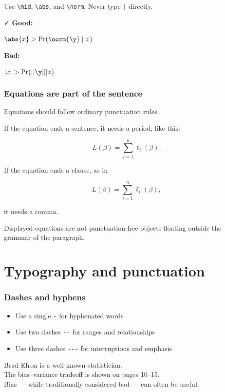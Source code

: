 \documentclass{article}
\newcommand{\xmark}{\textcolor{red}{\faXmark}}
\newcommand{\cmark}{\textcolor{goodcolor}{\faCheck}}
\newcommand{\bad}{\xmark\; \textbf{Bad:}}
\newcommand{\good}{\cmark\; \textbf{Good:}}
\begin{document}
Use \verb|\mid|, \verb|\abs|, and \verb|\norm|. Never type \verb/|/ directly.

\good

\begin{LTXexample}
$ \abs{x} > \Pr(\norm{\y} \mid z $)
\end{LTXexample}

\bad

\begin{LTXexample}
$ |x| > \Pr(||\y|| | z $)
\end{LTXexample}

\subsubsection*{Equations are part of the sentence}

Equations should follow ordinary punctuation rules.

\begin{LTXexample}
If the equation ends a sentence, it needs a
period, like this:

$$ L(\beta) = \sum_{i=1}^n \ell_i(\beta). $$

If the equation ends a clause, as in

$$ L(\beta) = \sum_{i=1}^n \ell_i(\beta), $$

it needs a comma.
\end{LTXexample}

Displayed equations are not punctuation-free objects floating outside the grammar of the paragraph.

\section{Typography and punctuation}

\subsubsection*{Dashes and hyphens}

\begin{itemize}
\item Use a single \verb|-| for hyphenated words
\item Use two dashes \verb|--| for ranges and relationships
\item Use three dashes \verb|---| for interruptions and emphasis
\end{itemize}

\begin{LTXexample}
Brad Efron is a well-known statistician. \\
The bias--variance tradeoff is shown on
pages 10--15. \\
Bias --- while traditionally considered bad ---
can often be useful.
\end{LTXexample}
\end{document}
